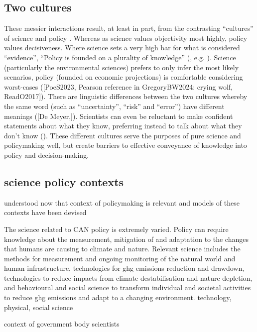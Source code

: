 \subsection{Two cultures}
These messier interactions result, at least in part, from the contrasting ``cultures'' of science and policy \cite{Obermeister2022}. Whereas as science values objectivity most highly, policy values decisiveness. Where science sets a very high bar for what is considered ``evidence'', ``Policy is founded on a plurality of knowledge'' (\cite{GluckmanBK2021}, e.g. \cite{PiddingtonMD2024}). Science (particularly the environmental sciences) prefers to only infer the most likely scenarios, policy (founded on economic projections) is comfortable considering worst-cases ([PoeS2023, Pearson reference in GregoryBW2024: crying wolf, ReadO2017]). There are linguistic differences between the two cultures whereby the same word (such as ``uncertainty'', ``risk''  and ``error'') have different meanings (\cite{SomervilleH2011,Makin2024}[De Meyer,]). Scientists can even be reluctant to make confident statements about what they know, preferring instead to talk about what they don't know (\cite{MountfordD2023}). These different cultures serve the purposes of pure science and policymaking well, but create barriers to effective conveyance of knowledge into policy and decision-making.


\subsection{science policy contexts}

understood now that context of policymaking is relevant \cite{CairneyW2017} and models of these contexts have been devised \cite{WeyrauchES2016}

The science related to CAN policy is extremely varied. Policy can require knowledge about the measurement, mitigation of and adaptation to the changes that humans are causing to climate and nature. Relevant science includes the methods for measurement and ongoing monitoring of the natural world and human infrastructure, technologies for ghg emissions reduction and drawdown, technologies to reduce impacts from climate destabilisation and nature depletion, and behavioural and social science to transform individual and societal activities to reduce ghg emissions and adapt to a changing environment. technology, physical, social science

\cite{DanfordDR2009} context of government body scientists

